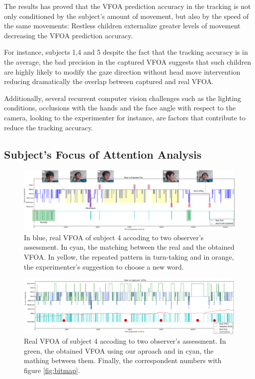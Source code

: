 \documentclass{sig-alternate}
\begin{document}
The results has proved that the VFOA prediction accuracy in the tracking is not only conditioned by the subject's amount of movement, but also by the speed of the same movements: Restless children externalize greater levels of movement decreasing the VFOA prediction accuracy. 

For instance, subjects 1,4 and 5 despite the fact that the tracking accuracy is in the average, the bad precision in the captured VFOA suggests that such children are highly likely to modify the gaze direction without head move intervention reducing dramatically the overlap between captured and real VFOA.

Additionally, several recurrent computer vision challenges such as the lighting conditions, occlusions with the hands and the face angle with respect to the camera, looking to the experimenter for instance, are factors that contribute to reduce the tracking accuracy.

\subsection{Subject's Focus of Attention Analysis}

\begin{figure}
    \centering
    \includegraphics[width=1.8\columnwidth]{realExpected}
    \caption{\small In blue, real VFOA of subject 4 accoding to two observer's assessment. In cyan, the matching between the real and the obtained VFOA. In yellow, the repeated pattern in turn-taking and in orange, the experimenter's suggestion to choose a new word.}
    \label{fig:realExpected}
    
\end{figure}

\begin{figure}
    \centering
    \includegraphics[width=1.81\columnwidth]{realCaptured}
    \caption{\small Real VFOA of subject 4 accoding to two observer's assessment. In green, the obtained VFOA using our aproach and in cyan, the mathing between them. Finally, the correspondent numbers with figure \ref{fig:bitmap}.}
    \label{fig:realCaptured}
\end{figure}
\end{document}
